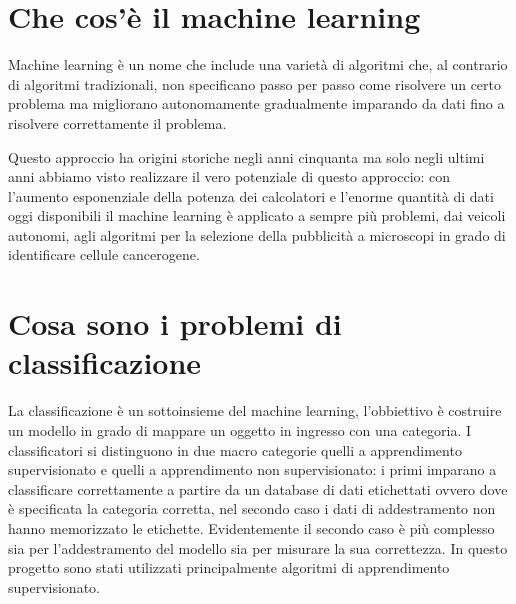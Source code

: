 \documentclass[a4paper,12pt]{report}
\begin{document}
\section{Che cos'è il machine learning} %
Machine learning è un nome che include una varietà di algoritmi che, al
contrario di algoritmi tradizionali, non specificano passo per passo come
risolvere un certo problema ma migliorano autonomamente gradualmente imparando
da dati fino a risolvere correttamente il problema. 

Questo approccio ha origini storiche negli anni cinquanta ma solo negli ultimi
anni abbiamo visto realizzare il vero potenziale di questo approccio: con
l'aumento esponenziale della potenza dei calcolatori e l'enorme quantità di dati
oggi disponibili il machine learning è applicato a sempre più problemi, dai
veicoli autonomi, agli algoritmi per la selezione della pubblicità a microscopi
in grado di identificare cellule cancerogene.





\section{Cosa sono i problemi di classificazione}

La classificazione è un sottoinsieme del machine learning, l'obbiettivo è
costruire un modello in grado di mappare un oggetto in ingresso con una
categoria. I classificatori si distinguono in due macro categorie quelli a
apprendimento supervisionato e quelli a apprendimento non supervisionato: i
primi imparano a classificare correttamente a partire da un database di dati
etichettati ovvero dove è specificata la categoria corretta, nel secondo caso i
dati di addestramento non hanno memorizzato le etichette. Evidentemente il
secondo caso è più complesso sia per l'addestramento del modello sia per
misurare la sua correttezza. In questo progetto sono stati utilizzati
principalmente algoritmi di apprendimento supervisionato.


\end{document}
